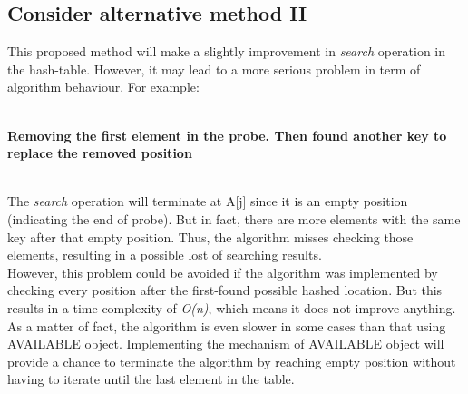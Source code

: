 \subsection{Consider alternative method II}
This proposed method will make a slightly improvement in \textit{search} operation in the hash-table. However, it may lead to a more serious problem in term of algorithm behaviour. For example:
\\
\\
\textbf{Removing the first element in the probe. Then found another key to replace the removed position}
\\
\\
The \textit{search} operation will terminate at A[j] since it is an empty position (indicating the end of probe). But in fact, there are more elements with the same key after that empty position. Thus, the algorithm misses checking those elements, resulting in a possible lost of searching results. 
\\
However, this problem could be avoided if the algorithm was implemented by checking every position after the first-found possible hashed location. But this results in a time complexity of \textit{O(n)}, which means it does not improve anything. As a matter of fact, the algorithm is even slower in some cases than that using AVAILABLE object. Implementing the mechanism of AVAILABLE object will provide a chance to terminate the algorithm by reaching empty position without having to iterate until the last element in the table.



